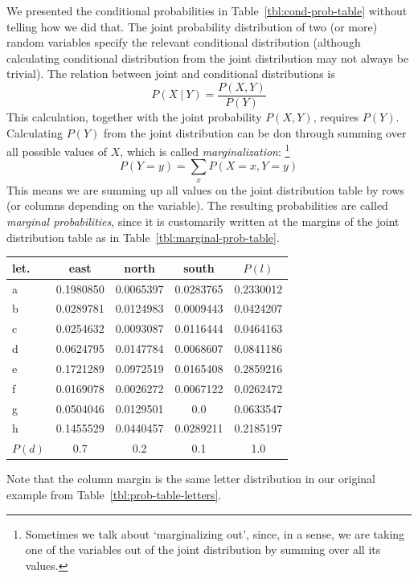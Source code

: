 We presented the conditional probabilities
in Table~\ref{tbl:cond-prob-table} without telling how we did that.
The joint probability distribution of two (or more) random variables specify
the relevant conditional distribution
(although calculating conditional distribution
from the joint distribution may not always be trivial).
The relation between joint and conditional distributions is
\begin{equation}\label{eq:cond-joint-prob}
  P(X\:\vert\:Y) = \frac{P(X,Y)}{P(Y)}
\end{equation}
This calculation, together with the joint probability $P(X,Y)$,
requires $P(Y)$.
Calculating $P(Y)$ from the joint distribution can be don through 
summing over all possible values of $X$,
which is called \emph{marginalization}:%
\footnote{
  Sometimes we talk about `marginalizing out',
  since, in a sense, we are taking one of the variables out of
  the joint distribution by summing over all its values.
}
\begin{equation*}\label{eq:marginal-prob-joint}
  P(Y = y)  = \sum_{x} P(X=x, Y=y)
\end{equation*}
This means we are summing up all values on the joint distribution table by rows (or columns depending on the variable).
The resulting probabilities are called \emph{marginal probabilities},
since it is customarily written at the margins of the joint distribution table as in Table~\ref{tbl:marginal-prob-table}.
\begin{margintable}
  \caption{\label{tbl:marginal-prob-table}%
    Joint probability table for letters and dialects
    with marginal probabilities.
    $P(d)$ is the (marginal) probability of dialects,
    and $P(l)$ is the probability of letters in the corpus.
  }
  \begin{center}
    \setlength{\tabcolsep}{4pt}
    \begin{tabular}{lS[round-precision=2]S[round-precision=2]S[round-precision=2]|S[round-precision=2]}
      \toprule
      let. & {east} & {north} & {south} & {$P(l)$} \\
      \midrule
      a & 0.1980850&0.0065397&0.0283765 & 0.2330012\\
      b & 0.0289781&0.0124983&0.0009443 & 0.0424207\\
      c & 0.0254632&0.0093087&0.0116444 & 0.0464163\\
      d & 0.0624795&0.0147784&0.0068607 & 0.0841186\\
      e & 0.1721289&0.0972519&0.0165408 & 0.2859216\\
      f & 0.0169078&0.0026272&0.0067122 & 0.0262472\\
      g & 0.0504046&0.0129501&0.0       & 0.0633547\\
      h & 0.1455529&0.0440457&0.0289211 & 0.2185197\\
      \midrule
      $P(d)$  & 0.7&0.2&0.1 & 1.0\\
      \bottomrule
    \end{tabular}
  \end{center}
\end{margintable}
Note that the column margin is the same letter distribution
in our original example  
from Table~\ref{tbl:prob-table-letters}.

